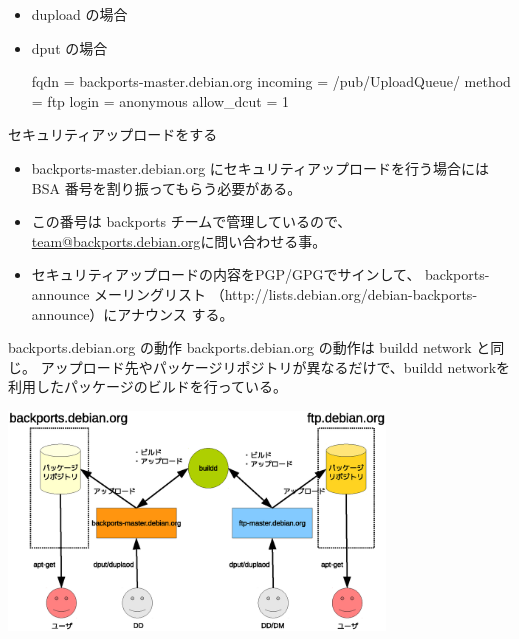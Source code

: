 \begin{frame}[containsverbatim]

\begin{itemize}
\item dupload の場合

\item dput の場合
\begin{commandline}
[bpo]
fqdn = backports-master.debian.org
incoming = /pub/UploadQueue/
method = ftp
login = anonymous
allow_dcut = 1
\end{commandline}
\end{itemize}

\end{frame}

\begin{frame}[containsverbatim]{セキュリティアップロードをする}
\begin{itemize}
\item backports-master.debian.org にセキュリティアップロードを行う場合には
BSA 番号を割り振ってもらう必要がある。
\item この番号は backports チームで管理しているので、
      \url{team@backports.debian.org}に問い合わせる事。
\item セキュリティアップロードの内容をPGP/GPGでサインして、
backports-announce メーリングリスト
      （http://lists.debian.org/debian-backports-announce）にアナウンス
      する。
\end{itemize}
\end{frame}

\begin{frame}[containsverbatim]{backports.debian.org の動作}
backports.debian.org の動作は buildd network と同じ。
アップロード先やパッケージリポジトリが異なるだけで、buildd networkを
利用したパッケージのビルドを行っている。

\begin{center}
\includegraphics[width=10cm]{image201104/backports-buildd_color.eps}
\end{center}
\end{frame}

